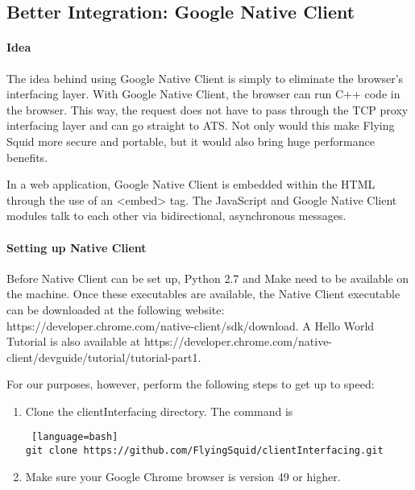 \begin{appendices}



\section{Better Integration: Google Native Client }

\paragraph{Idea}

The idea behind using Google Native Client \cite{GoogleNativeClient} is simply to eliminate the browser's interfacing layer. With Google Native Client, the browser can run C++ code in the browser. This way, the request does not have to pass through the TCP proxy interfacing layer and can go straight to ATS. Not only would this make Flying Squid more secure and portable, but it would also bring huge performance benefits.

In a web application, Google Native Client is embedded within the HTML through the use of an <embed> tag. The JavaScript and Google Native Client modules talk to each other via bidirectional, asynchronous messages.

\paragraph{Setting up Native Client}

Before Native Client can be set up, Python 2.7 and Make need to be available on the machine. Once these executables are available, the Native Client executable can be downloaded at the following website: https://developer.chrome.com/native-client/sdk/download. A Hello World Tutorial is also available at https://developer.chrome.com/native-client/devguide/tutorial/tutorial-part1.

For our purposes, however, perform the following steps to get up to speed:

\begin{enumerate} 
\item Clone the clientInterfacing directory. The command is 

\begin{lstlisting} [language=bash] 
git clone https://github.com/FlyingSquid/clientInterfacing.git
\end{lstlisting}

\item  Make sure your Google Chrome browser is version 49 or higher.


\end{enumerate}
\end{appendices}
